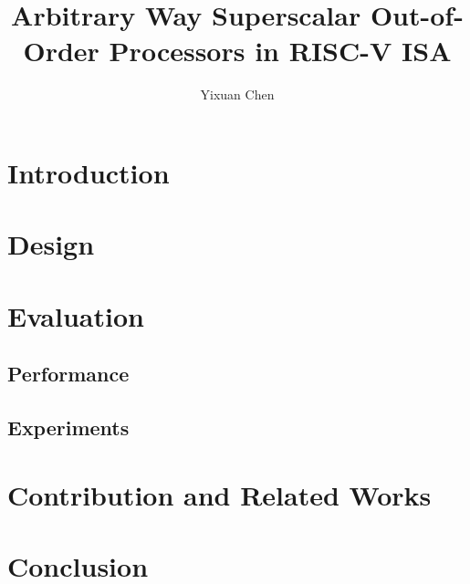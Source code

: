 \documentclass[sigplan,review]{acmart}\settopmatter{printfolios=true,printccs=false,printacmref=false}
\begin{document}
\title[]{Arbitrary Way Superscalar Out-of-Order Processors in RISC-V ISA} \author{Yixuan Chen}

 

\begin{abstract}
  \lipsum[1]
\end{abstract}


\maketitle

\section{Introduction}



\section{Design}













\section{Evaluation}

\subsection{Performance}



\subsection{Experiments}







\section{Contribution and Related Works}



\section{Conclusion}




\end{document}
